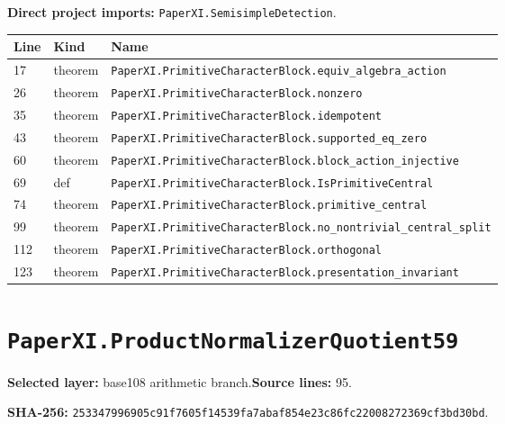 \documentclass[10pt,oneside]{book}
\begin{document}
\textbf{Direct project imports:} \nolinkurl{PaperXI.SemisimpleDetection}.

\begin{longtable}{@{}p{}p{}p{}@{}}\toprule Line&Kind&Name\\\midrule\endhead

17&theorem&\nolinkurl{PaperXI.PrimitiveCharacterBlock.equiv_algebra_action}\\

26&theorem&\nolinkurl{PaperXI.PrimitiveCharacterBlock.nonzero}\\

35&theorem&\nolinkurl{PaperXI.PrimitiveCharacterBlock.idempotent}\\

43&theorem&\nolinkurl{PaperXI.PrimitiveCharacterBlock.supported_eq_zero}\\

60&theorem&\nolinkurl{PaperXI.PrimitiveCharacterBlock.block_action_injective}\\

69&def&\nolinkurl{PaperXI.PrimitiveCharacterBlock.IsPrimitiveCentral}\\

74&theorem&\nolinkurl{PaperXI.PrimitiveCharacterBlock.primitive_central}\\

99&theorem&\nolinkurl{PaperXI.PrimitiveCharacterBlock.no_nontrivial_central_split}\\

112&theorem&\nolinkurl{PaperXI.PrimitiveCharacterBlock.orthogonal}\\

123&theorem&\nolinkurl{PaperXI.PrimitiveCharacterBlock.presentation_invariant}\\

\bottomrule\end{longtable}

\section{\texorpdfstring{\nolinkurl{PaperXI.ProductNormalizerQuotient59}}{PaperXI.ProductNormalizerQuotient59}}\label{module:PaperXI.ProductNormalizerQuotient59}

\textbf{Selected layer:} base108 arithmetic branch.\quad\textbf{Source lines:} 95.\par\textbf{SHA-256:} {\scriptsize\nolinkurl{253347996905c91f7605f14539fa7abaf854e23c86fc22008272369cf3bd30bd}}.
\end{document}
